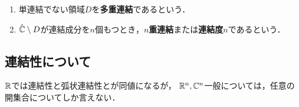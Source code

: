 \documentclass[uplatex, dvipdfmx]{jsreport}
\begin{document}
\begin{definition}\mbox{}
    \begin{enumerate}
        \item 単連結でない領域$D$を\textbf{多重連結}であるという．
        \item $\hat{\mathbb{C}}\setminus D$が連結成分を$n$個もつとき，\textbf{$n$重連結}または\textbf{連結度$n$}であるという．
    \end{enumerate}
\end{definition}

\subsection{連結性について}

\begin{tcolorbox}[colframe=ForestGreen, colback=ForestGreen!10!white,breakable,colbacktitle=ForestGreen!40!white,coltitle=black,fonttitle=\bfseries\sffamily,
title=]
    $\mathbb{R}$では連結性と弧状連結性とが同値になるが，
    $\mathbb{R}^n,\mathbb{C}^n$一般については，任意の開集合についてしか言えない．
\end{tcolorbox}
\end{document}
